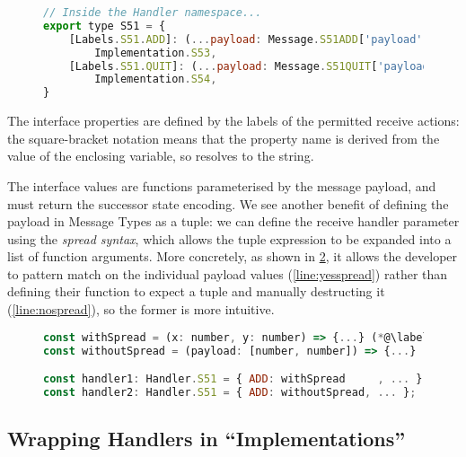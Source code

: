 \begin{figure}[!ht]
\begin{lstlisting}[language=javascript,tabsize=2]
// Inside the Handler namespace...
export type S51 = {
	[Labels.S51.ADD]: (...payload: Message.S51ADD['payload']) =>
		Implementation.S53,
	[Labels.S51.QUIT]: (...payload: Message.S51QUIT['payload']) => 
		Implementation.S54,
}
\end{lstlisting}
\label{lst:addersvrreceivehandler}
\end{figure}

The interface properties are defined by the 
labels of the permitted receive actions:
the square-bracket notation means that the property name
is derived from the value of the enclosing variable,
so  resolves to the
 string. 

The interface values are functions parameterised by
the message payload, and must return the successor state encoding.
We see another benefit of defining the payload in Message Types
as a tuple: we can define the receive handler parameter
using the \textit{spread syntax}, which allows the tuple
expression to be expanded into a list of function arguments. 
More concretely, as shown in \cref{lst:nodeefsmspread},
it allows the developer to pattern match on the
individual payload values (\cref{line:yesspread}) 
rather than defining their function to expect a tuple 
and manually destructing it (\cref{line:nospread}),
so the former is more intuitive.

\begin{figure}[!ht]
\begin{lstlisting}[language=javascript,tabsize=2]
const withSpread = (x: number, y: number) => {...} (*@\label{line:yesspread}@*)
const withoutSpread = (payload: [number, number]) => {...} (*@\label{line:nospread}@*)

const handler1: Handler.S51 = { ADD: withSpread		, ... };	// OK
const handler2: Handler.S51 = { ADD: withoutSpread, ... };	// OK
\end{lstlisting}
\label{lst:nodeefsmspread}
\end{figure}

\subsection{Wrapping Handlers in ``Implementations''}
\label{subsection:nodeefsmimplementation}

